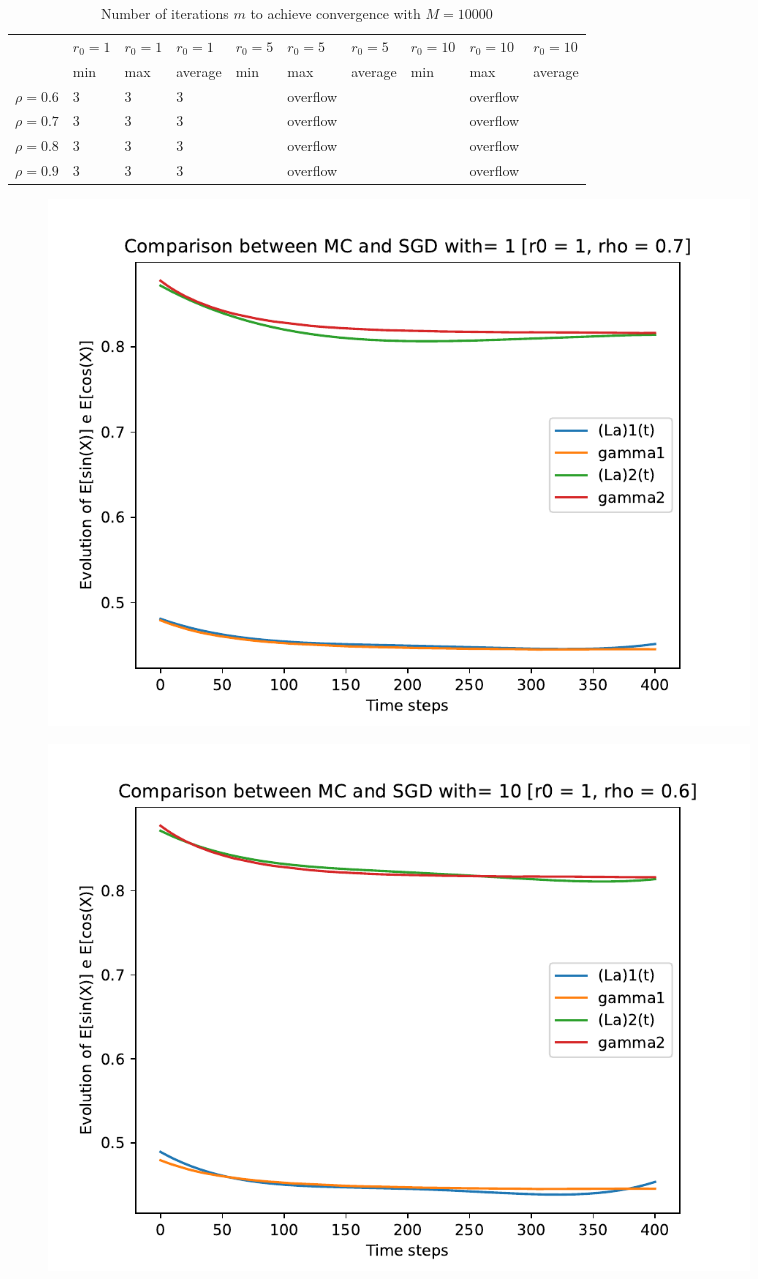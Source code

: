 \documentclass[a4paper,11pt,openright]{report}
\begin{document}
\begin{table}[H]
\centering
\addtolength{\leftskip}{-1.5cm}
\addtolength{\rightskip}{-1.5cm}
\begin{tabular}{|c|lllllllll|}
\hline
$ $ & $r_0 = 1$ & $r_0 = 1$ & $r_0 = 1$ & $r_0 = 5$ & $r_0 = 5$ & $r_0 = 5$ & $r_0 = 10$ & $r_0 = 10$ & $r_0 = 10$  \\
$ $ & min & max & average & min & max & average & min & max & average \\ 
\hline
$\rho = 0.6$ & 3 & 3 & 3 &  & overflow & &  & overflow &  \\

$\rho = 0.7$ & 3 & 3 & 3 &  & overflow & &  & overflow &  \\

$\rho = 0.8$ & 3 & 3 & 3 &  & overflow & &  & overflow &  \\

$\rho = 0.9$ & 3 & 3 & 3 &  & overflow & &  & overflow &  \\
\hline
\end{tabular}
\caption{Number of iterations $m$ to achieve convergence with $M = 10000$}
\end{table}
\begin{figure}[H]
\centering
\includegraphics[width=0.9\textwidth]{images/graphs T = 4/n = 4, M = 1 sine and cosine.pdf}
\end{figure}
\begin{figure}[H]
\centering
\includegraphics[width=0.9\textwidth]{images/graphs T = 4/n = 4, M = 10 sine and cosine.pdf}
\end{figure}
\end{document}
